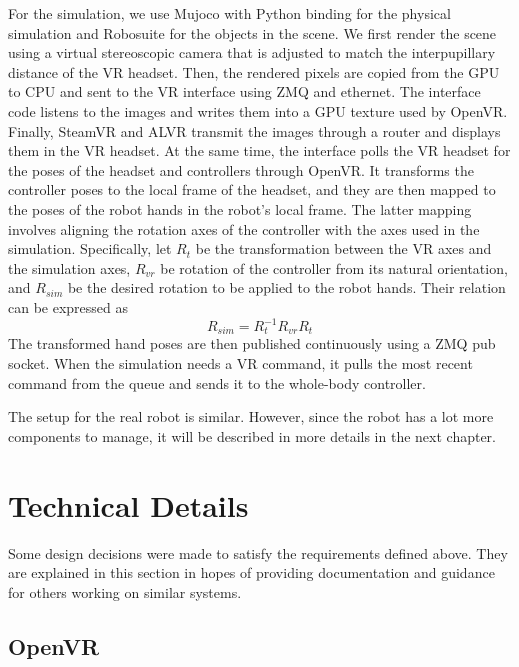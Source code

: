 For the simulation, we use Mujoco \cite{6386109} with Python binding for the physical simulation and Robosuite \cite{zhu2022robosuite} for the objects in the scene. We first render the scene using a virtual stereoscopic camera that is adjusted to match the interpupillary distance of the VR headset. Then, the rendered pixels are copied from the GPU to CPU and sent to the VR interface using ZMQ and ethernet. The interface code listens to the images and writes them into a GPU texture used by OpenVR. Finally, SteamVR and ALVR transmit the images through a router and displays them in the VR headset. At the same time, the interface polls the VR headset for the poses of the headset and controllers through OpenVR. It transforms the controller poses to the local frame of the headset, and they are then mapped to the poses of the robot hands in the robot's local frame. The latter mapping involves aligning the rotation axes of the controller with the axes used in the simulation. Specifically, let $R_t$ be the transformation between the VR axes and the simulation axes, $R_{vr}$ be rotation of the controller from its natural orientation, and $R_{sim}$ be the desired rotation to be applied to the robot hands. Their relation can be expressed as 
$$
R_{sim} = R_t^{-1} R_{vr} R_t
$$
The transformed hand poses are then published continuously using a ZMQ pub socket. When the simulation needs a VR command, it pulls the most recent command from the queue and sends it to the whole-body controller. 

The setup for the real robot is similar. However, since the robot has a lot more components to manage, it will be described in more details in the next chapter.

\section{Technical Details}

Some design decisions were made to satisfy the requirements defined above. They are explained in this section in hopes of providing documentation and guidance for others working on similar systems.

\subsection{OpenVR}

